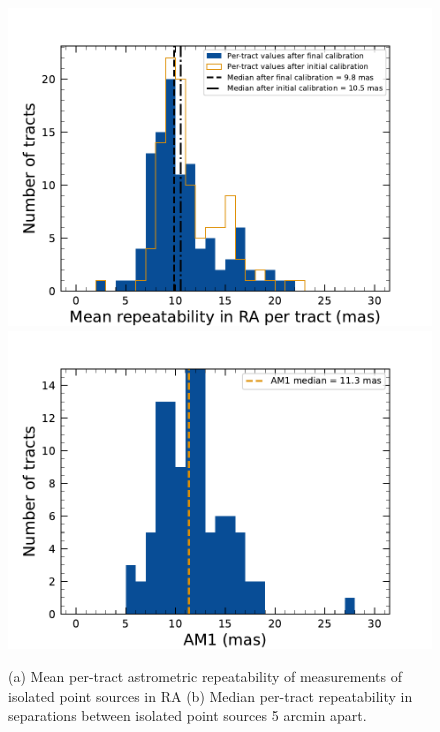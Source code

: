 \begin{figure}[htb!]
\centering
\includegraphics[scale=0.29]{figures/Astrometry_dmAstroErr.pdf}
\includegraphics[scale=0.29]{figures/Astrometry_AM1.pdf}
\caption{(a) Mean per-tract astrometric repeatability of measurements of isolated point sources in RA (b) Median per-tract repeatability in separations
between isolated point sources 5 arcmin apart.}
\label{fig:AM1_and_dm_astro_error}
\end{figure}

